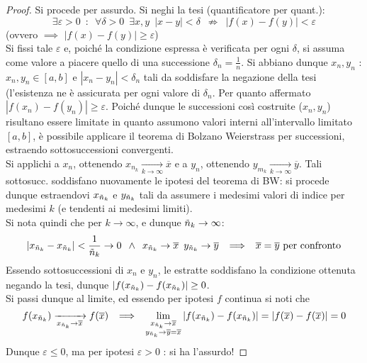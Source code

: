 \documentclass[10pt]{article}
\theoremstyle{plain}
\begin{document}
\begin{proof}
    Si procede per assurdo. Si neghi la tesi (quantificatore per quant.):
    \[\exists \varepsilon > 0 \enspace : \enspace \forall \delta > 0 \enspace \exists x,y \enspace |x-y|< \delta \enspace \nRightarrow \enspace |f(x) - f(y)| < \varepsilon\]
    (ovvero $\implies$ $|f(x) - f(y)| \geq \varepsilon$)
    \\Si fissi tale $\varepsilon$ e, poiché la condizione espressa è verificata per ogni $\delta$, si assuma come valore a piacere quello di una successione $\delta_n = \frac{1}{n}$. Si abbiano dunque $x_n, y_n$ : $x_n, y_n \in [a,b]$ e $|x_n - y_n| < \delta_n$ tali da soddisfare la negazione della tesi (l'esistenza ne è assicurata per ogni valore di $\delta_n$. Per quanto affermato $|f(x_n) - f(y_n)| \geq \varepsilon$. Poiché dunque le successioni così costruite ($x_n, y_n$) risultano essere limitate in quanto assumono valori interni all'intervallo limitato $[a,b]$, è possibile applicare il teorema di Bolzano Weierstrass per successioni, estraendo sottosuccessioni convergenti.
    \\Si applichi a $x_n$, ottenendo $x_{n_k} \xrightarrow[k \rightarrow \infty]{} \overline{x}$ e a $y_n$, ottenendo $y_{m_k} \xrightarrow[k \rightarrow \infty]{} \overline{y}$. Tali sottosucc. soddisfano nuovamente le ipotesi del teorema di BW: si procede dunque estraendovi $x_{\Tilde{n}_k}$ e $y_{\Tilde{n}_k}$ tali da assumere i medesimi valori di indice per medesimi $k$ (e tendenti ai medesimi limiti).
    \\Si nota quindi che per $k \rightarrow \infty$, e dunque $\Tilde{n}_k \rightarrow \infty$:
    \[|x_{\Tilde{n}_k} - x_{\Tilde{n}_k}| < \frac{1}{\Tilde{n}_k} \rightarrow 0 \enspace \land \enspace x_{\Tilde{n}_k} \rightarrow \overline{x} \enspace  y_{\Tilde{n}_k} \rightarrow \overline{y} \enspace \implies \enspace \overline{x} = \overline{y} \textrm{ per confronto}\]
    Essendo sottosuccessioni di $x_n$ e $y_n$, le estratte soddisfano la condizione ottenuta negando la tesi, dunque $|f(x_{\Tilde{n}_k}) - f(x_{\Tilde{n}_k})| \geq 0$. 
    \\Si passi dunque al limite, ed essendo per ipotesi $f$ continua si noti che 
    \[f(x_{\Tilde{n}_k}) \xrightarrow[x_{\Tilde{n}_k} \rightarrow \overline{x}]{} f(\overline{x}) \enspace \implies \enspace \lim_{\substack{x_{\Tilde{n}_k} \rightarrow \overline{x} \\ y_{\Tilde{n}_k} \rightarrow \overline{y} = \overline{x}}} |f(x_{\Tilde{n}_k}) - f(x_{\Tilde{n}_k})| = |f(\overline{x}) - f(\overline{x})| = 0\]
    Dunque $\varepsilon \leq 0$, ma per ipotesi $\varepsilon > 0$ : si ha l'assurdo!
\end{proof}
\end{document}
